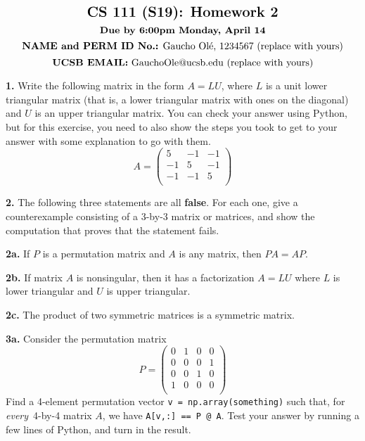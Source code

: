 \documentclass[11pt]{article}
\begin{document}
$$\mbox{\Large \textbf {CS 111 (S19): Homework 2}}$$
$$\mbox{\textbf {Due by 6:00pm Monday, April 14}}$$
$$\mbox{\textbf {NAME and PERM ID No.:} Gaucho Ol\'e, 1234567 (replace with yours)}$$
$$\mbox{\textbf {UCSB EMAIL:} GauchoOle@ucsb.edu (replace with yours)}$$

\par\bigskip
\textbf {1.}
Write the following matrix in the form $A=LU$, 
where $L$ is a unit lower triangular matrix
(that is, a lower triangular matrix with ones on the diagonal) 
and $U$ is an upper triangular matrix. You can check your answer using Python, but for this exercise, you need to also show the steps you took to get to your answer with some explanation to go with them.
$$A =
   \left(
   \begin{array}{ccc}
    5 & -1 & -1 \\  
   -1 &  5 & -1 \\ 
   -1 & -1 &  5 \\
   \end{array} \right)
$$

\par\bigskip
\textbf {2.}
The following three statements are all \textbf {false}. For each one, 
give a counterexample consisting of a 3-by-3 matrix or matrices, 
and show the computation that proves that the statement fails.

\par\medskip
\textbf {2a.}
If $P$ is a permutation matrix and $A$ is any matrix, then $PA=AP$.

\par\medskip
\textbf {2b.}
If matrix $A$ is nonsingular, then it has a factorization $A=LU$
where $L$ is lower triangular and $U$ is upper triangular.

\par\medskip
\textbf {2c.}
The product of two symmetric matrices is a symmetric matrix.

\par\bigskip
\textbf {3a.} Consider the permutation matrix 
$$P =
   \left(
   \begin{array}{cccc}
    0 & 1 & 0 & 0 \\  
    0 & 0 & 0 & 1 \\  
    0 & 0 & 1 & 0 \\  
    1 & 0 & 0 & 0 \\  
   \end{array} \right)
$$
Find a 4-element permutation vector {\tt v = np.array(something)}
such that, for {\em every}\, 4-by-4 matrix $A$, 
we have {\tt A[v,:] == P @ A}.
Test your answer by running a few lines of Python, 
and turn in the result. 
\end{document}
